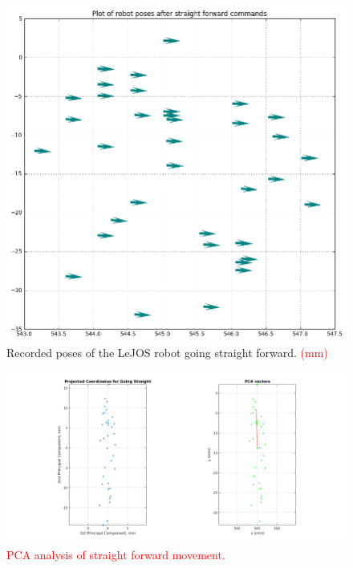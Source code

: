 \documentclass[paper=a4, fontsize=11pt]{scrartcl} %
\begin{document}
    \begin{figure}[H]
        \begin{center}
            \setlength{\fboxsep}{0.5pt} %
            \setlength{\fboxrule}{0.5pt}
            \includegraphics[width=0.7\linewidth,fbox]{images/poses_plot_1_straight.png}
            \caption{Recorded poses of the LeJOS robot going straight forward. \textcolor{red}{(mm)}}
        \end{center}
    \end{figure}
    \begin{figure}[H]
        \begin{center}
            \setlength{\fboxsep}{0.5pt} %
            \setlength{\fboxrule}{0.5pt}
            \includegraphics[width=\linewidth,fbox]{images/pca_straight.png}
            \caption{\textcolor{red}{PCA analysis of straight forward movement.}}
        \end{center}
    \end{figure}
\end{document}
